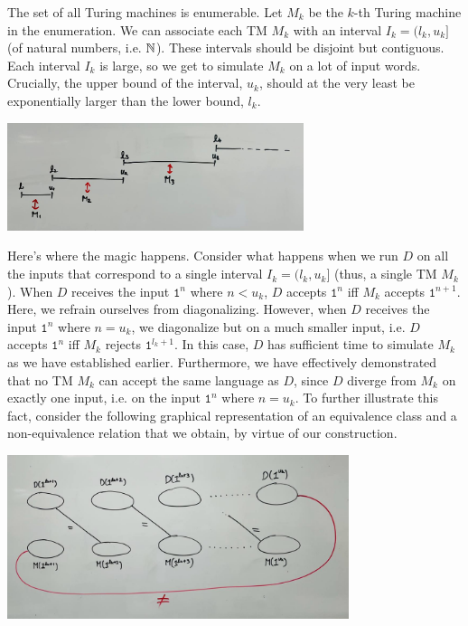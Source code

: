 \documentclass[11pt,twoside=off,numbers=noenddot]{scrbook}
\begin{document}
\begin{proofidea}
  The set of all Turing machines is enumerable. Let $M_k$ be the $k$-th Turing machine in the enumeration. We can associate each TM $M_k$ with an interval $I_k = (l_k, u_k]$ (of natural numbers, i.e. $\mathbb N$). These intervals should be disjoint but contiguous. Each interval $I_k$ is large, so we get to simulate $M_k$ on a lot of input words. Crucially, the upper bound of the interval, $u_k$, should at the very least be exponentially larger than the lower bound, $l_k$.
  \begin{center}
    \includegraphics[width=0.65\textwidth]{media/turing_machine_intervals.jpg}
  \end{center}
  Here's where the magic happens. Consider what happens when we run $D$ on all the inputs that correspond to a single interval $I_k = (l_k, u_k]$ (thus, a single TM $M_k$). When $D$ receives the input $\texttt{1}^n$ where $n < u_k$, $D$ accepts $\texttt{1}^n$ iff $M_k$ accepts $\texttt{1}^{n + 1}$. Here, we refrain ourselves from diagonalizing. However, when $D$ receives the input $\texttt{1}^n$ where $n = u_k$, we diagonalize but on a much smaller input, i.e. $D$ accepts $\texttt{1}^n$ iff $M_k$ rejects $\texttt{1}^{l_k + 1}$. In this case, $D$ has sufficient time to simulate $M_k$ as we have established earlier. Furthermore, we have effectively demonstrated that no TM $M_k$ can accept the same language as $D$, since $D$ diverge from $M_k$ on exactly one input, i.e. on the input $\texttt{1}^n$ where $n = u_k$. To further illustrate this fact, consider the following graphical representation of an equivalence class and a non-equivalence relation that we obtain, by virtue of our construction.
  \begin{center}
    \includegraphics[width=0.75\textwidth]{media/lazy_diagonalization.jpg}

\end{center}
\end{proofidea}
\end{document}
